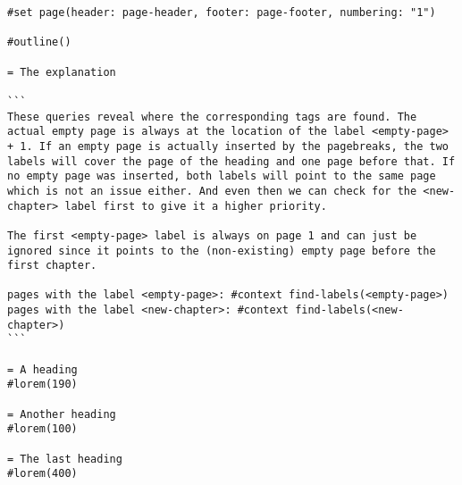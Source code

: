 \begin{verbatim}
#set page(header: page-header, footer: page-footer, numbering: "1")

#outline()

= The explanation

```
These queries reveal where the corresponding tags are found. The actual empty page is always at the location of the label <empty-page> + 1. If an empty page is actually inserted by the pagebreaks, the two labels will cover the page of the heading and one page before that. If no empty page was inserted, both labels will point to the same page which is not an issue either. And even then we can check for the <new-chapter> label first to give it a higher priority.

The first <empty-page> label is always on page 1 and can just be ignored since it points to the (non-existing) empty page before the first chapter.

pages with the label <empty-page>: #context find-labels(<empty-page>)
pages with the label <new-chapter>: #context find-labels(<new-chapter>)
```

= A heading
#lorem(190)

= Another heading
#lorem(100)

= The last heading
#lorem(400)
\end{verbatim}

